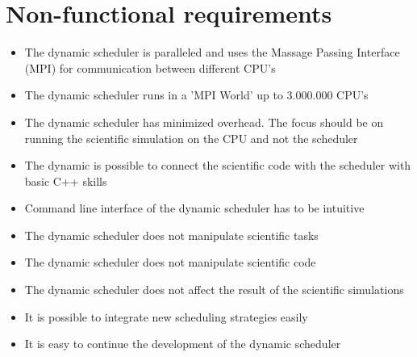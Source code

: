 {
\setcounter{funcNFR}{10}
\renewcommand{\labelitemi}{
	\ifnum \value{funcNFR}<10$/NF 0\arabic{funcNFR} /$\addtocounter{funcNFR}{10}
	\else $/NF \arabic{funcNFR} /$\addtocounter{funcNFR}{10}\fi
}

\section{Non-functional requirements}
	\begin{itemize}
		\item The dynamic scheduler is paralleled and uses the Massage Passing Interface (MPI) for communication between different CPU's
		\item The dynamic scheduler runs in a 'MPI World' up to 3.000.000 CPU's
		\item The dynamic scheduler has minimized overhead. The focus should be on running the scientific simulation on the CPU and not the scheduler
		\item The dynamic is possible to connect the scientific code with the scheduler with basic C++ skills%
		\item Command line interface of the dynamic scheduler has to be intuitive
		\item The dynamic scheduler does not manipulate scientific tasks
		\item The dynamic scheduler does not manipulate scientific code
		\item The dynamic scheduler does not affect the result of the scientific simulations
		\item It is possible to integrate new scheduling strategies easily
		\item It is easy to continue the development of the dynamic scheduler
	\end{itemize}
}